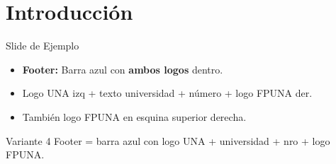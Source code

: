 \documentclass[12pt, aspectratio=169]{beamer}
\begin{document}
\section{Introducci\'on}
\begin{frame}{Slide de Ejemplo}
\begin{itemize}
  \item \textbf{Footer:} Barra azul con \textbf{ambos logos} dentro.
  \item Logo UNA izq + texto universidad + n\'umero + logo FPUNA der.
  \item Tambi\'en logo FPUNA en esquina superior derecha.
\end{itemize}
\begin{block}{Variante 4}
  Footer = barra azul con logo UNA + universidad + nro + logo FPUNA.
\end{block}
\end{frame}
\end{document}
